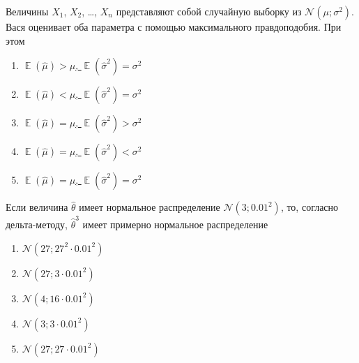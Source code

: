 \documentclass[t]{beamer}
\DeclareMathOperator{\E}{\mathbb{E}}
\newcommand{\cN}{\mathcal{N}}
\begin{document}
 \begin{frame} \label{18} 
\begin{block}{18} 

  Величины $X_1$, $X_2$, \ldots, $X_n$ представляют собой случайную выборку из $\cN(\mu; \sigma^2)$. Вася оценивает оба параметра с помощью максимального правдоподобия. При этом


 \end{block} 
\begin{enumerate} 
\item[] \hyperlink{18-No}{\beamergotobutton{} $\E(\hat \mu)>\mu$, $\E(\hat\sigma^2) = \sigma^2$}
\item[] \hyperlink{18-No}{\beamergotobutton{} $\E(\hat \mu)<\mu$, $\E(\hat\sigma^2) = \sigma^2$}
\item[] \hyperlink{18-No}{\beamergotobutton{} $\E(\hat \mu)=\mu$, $\E(\hat\sigma^2) > \sigma^2$}
\item[] \hyperlink{18-Yes}{\beamergotobutton{} $\E(\hat \mu)=\mu$, $\E(\hat\sigma^2) < \sigma^2$}
\item[] \hyperlink{18-No}{\beamergotobutton{} $\E(\hat \mu)=\mu$, $\E(\hat\sigma^2) = \sigma^2$}
\end{enumerate} 
\end{frame} 


 \begin{frame} \label{19} 
\begin{block}{19} 

    Если величина $\hat\theta$ имеет нормальное распределение $\cN(3;0.01^2)$, то, согласно дельта-методу, $\hat\theta^3$ имеет примерно нормальное распределение
    

 \end{block} 
\begin{enumerate} 
\item[] \hyperlink{19-Yes}{\beamergotobutton{} $\cN(27;27^2\cdot 0.01^2)$}
\item[] \hyperlink{19-No}{\beamergotobutton{} $\cN(27;3\cdot 0.01^2)$}
\item[] \hyperlink{19-No}{\beamergotobutton{} $\cN(4;16\cdot 0.01^2)$}
\item[] \hyperlink{19-No}{\beamergotobutton{} $\cN(3;3\cdot 0.01^2)$}
\item[] \hyperlink{19-No}{\beamergotobutton{} $\cN(27;27\cdot 0.01^2)$}
\end{enumerate} 
\end{frame} 
\end{document}
